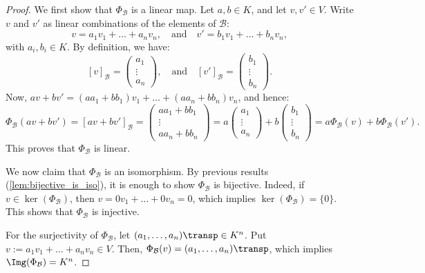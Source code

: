 \begin{proof}
We first show that $\Phi_{\mathcal{B}}$ is a linear map. Let $a, b \in K$, and let $v, v' \in V$. Write $v$ and $v'$ as linear combinations of the elements of $\mathcal{B}$:
\[
v = a_1 v_1 + \dots + a_n v_n, \quad \text{and} \quad v' = b_1 v_1 + \dots + b_n v_n,
\]
with $a_i, b_i \in K$. By definition, we have:
\[
[v]_{\mathcal{B}} = 
\begin{pmatrix}
a_1 \\
\vdots \\
a_n
\end{pmatrix},
\quad \text{and} \quad
[v']_{\mathcal{B}} = 
\begin{pmatrix}
b_1 \\
\vdots \\
b_n
\end{pmatrix}.
\]
Now, $a v + b v' = (a a_1 + b b_1) v_1 + \dots + (a a_n + b b_n) v_n$, and hence:
\[
\Phi_{\mathcal{B}}(a v + b v') = [a v + b v']_{\mathcal{B}} = 
\begin{pmatrix}
a a_1 + b b_1 \\
\vdots \\
a a_n + b b_n
\end{pmatrix}
= a 
\begin{pmatrix}
a_1 \\
\vdots \\
a_n
\end{pmatrix}
+ b
\begin{pmatrix}
b_1 \\
\vdots \\
b_n
\end{pmatrix}
= a \Phi_{\mathcal{B}}(v) + b \Phi_{\mathcal{B}}(v').
\]
This proves that $\Phi_{\mathcal{B}}$ is linear. 

We now claim that $\Phi_{\mathcal{B}}$ is an isomorphism. By previous results (\cref{lem:bijective_is_iso}), it is enough to show $\Phi_{\mathcal{B}}$ is bijective. Indeed, if $v \in \ker(\Phi_{\mathcal{B}})$, then $v = 0 v_1 + \dots + 0 v_n = 0$, which implies $\ker(\Phi_{\mathcal{B}}) = \{0\}$. This shows that $\Phi_{\mathcal{B}}$ is injective. 

For the surjectivity of $\Phi_{\mathcal{B}}$, let $(a_1, \dots, a_n)\transp \in K^n$. Put $v := a_1 v_1 + \dots + a_n v_n \in V$. Then, $\Phi_{\mathcal{B}}(v) = (a_1, \dots, a_n)\transp$, which implies $\Img(\Phi_{\mathcal{B}}) = K^n$.
\end{proof}

